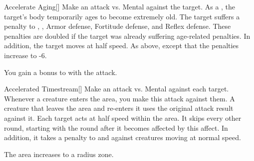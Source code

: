 \lowercase{\hypertarget{spell:Accelerate Aging}{}}\label{spell:Accelerate Aging}
\begin{freeability}[Rank 5]{\hypertarget{spell:Accelerate Aging}{Accelerate Aging}}[]
Make an attack vs. Mental against the target.
\hit As a , the target's body temporarily ages to become extremely old.
The target suffers a  penalty to , , Armor defense, Fortitude defense, and Reflex defense.
These penalties are doubled if the target was already suffering age-related penalties.
In addition, the target moves at half speed.
\crit As above, except that the penalties increase to -6.

\rankline
{} You gain a  bonus to  with the attack.
\end{freeability}
\vspace{0.25em}



\lowercase{\hypertarget{spell:Accelerated Timestream}{}}\label{spell:Accelerated Timestream}
\begin{freeability}[Rank 5]{\hypertarget{spell:Accelerated Timestream}{Accelerated Timestream}}[]
Make an attack vs. Mental against each target.
Whenever a creature enters the area, you make this attack against them.
A creature that leaves the area and re-enters it uses the original attack result against it.
\hit Each target acts at half speed within the area.
It skips every other round, starting with the round after it becomes affected by this affect.
In addition, it takes a  penalty to  and  against creatures moving at normal speed.

\rankline
{} The area increases to a \arealarge radius zone.
\end{freeability}
\vspace{0.25em}



